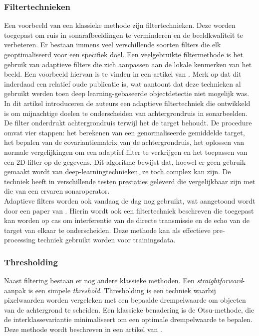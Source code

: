 \subsubsection{Filtertechnieken}

Een voorbeeld van een klassieke methode zijn filtertechnieken. Deze worden toegepast om ruis in sonarafbeeldingen te verminderen en de beeldkwaliteit te verbeteren. Er bestaan immens veel verschillende soorten filters die elk geoptimaliseerd voor een specifiek doel. Een veelgebruikte filtermethode is het gebruik van adaptieve filters die zich aanpassen aan de lokale kenmerken van het beeld. Een voorbeeld hiervan is te vinden in een artikel van \textcite{Aridgides_1995}. Merk op dat dit inderdaad een relatief oude publicatie is, wat aantoont dat deze technieken al gebruikt werden toen deep learning-gebaseerde objectdetectie niet mogelijk was. \\

In dit artikel introduceren de auteurs een adaptieve filtertechniek die ontwikkeld is om mijnachtige doelen te onderscheiden van achtergrondruis in sonarbeelden. De filter onderdrukt achtergrondruis terwijl het de target behoudt. De procedure omvat vier stappen: het berekenen van een genormaliseerde gemiddelde target, het bepalen van de covariantiematrix van de achtergrondruis, het oplossen van normale vergelijkingen om een adaptief filter te verkrijgen en het toepassen van een 2D-filter op de gegevens. Dit algoritme bewijst dat, hoewel er geen gebruik gemaakt wordt van deep-learningtechnieken, ze toch complex kan zijn. De techniek heeft in verschillende testen prestaties geleverd die vergelijkbaar zijn met die van een ervaren sonaroperator. \\

Adaptieve filters worden ook vandaag de dag nog gebruikt, wat aangetoond wordt door een paper van \textcite{Lourey_2017}. Hierin wordt ook een filtertechniek beschreven die toegepast kan worden op \gls{cas} om interferentie van de directe transmissie en de echo van de target van elkaar te onderscheiden. Deze methode kan als effectieve pre-processing techniek gebruikt worden voor trainingsdata.

\subsubsection{Thresholding}

Naast filtering bestaan er nog andere klassieke methoden. Een \emph{straightforward}-aanpak is een simpele \emph{threshold}. Thresholding is een techniek waarbij pixelwaarden worden vergeleken met een bepaalde drempelwaarde om objecten van de achtergrond te scheiden. Een klassieke benadering is de Otsu-methode, die de interklassevariantie minimaliseert om een optimale drempelwaarde te bepalen. Deze methode wordt beschreven in een artikel van \textcite{Otsu_1979}.

